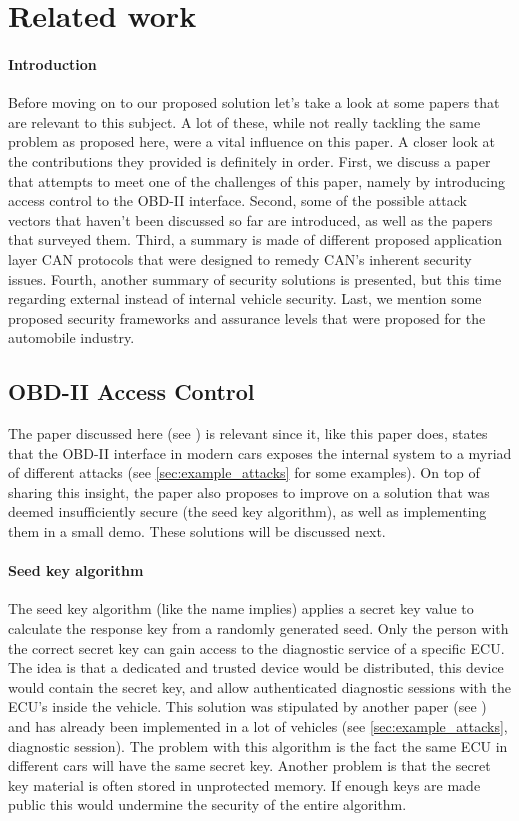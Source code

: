 \documentclass[master=cws,masteroption=vs,english]{kulemt}
\begin{document}
\section{Related work}
\label{sec:related_work}

\paragraph{Introduction} Before moving on to our proposed solution let's take a look at some papers that are relevant to this subject. A lot of these, while not really tackling the same problem as proposed here, were a vital influence on this paper. A closer look at the contributions they provided is definitely in order. First, we discuss a paper that attempts to meet one of the challenges of this paper, namely by introducing access control to the OBD-II interface. Second, some of the possible attack vectors that haven't been discussed so far are introduced, as well as the papers that surveyed them. Third, a summary is made of different proposed application layer CAN protocols that were designed to remedy CAN's inherent security issues. Fourth, another summary of security solutions is presented, but this time regarding external instead of internal vehicle security. Last, we mention some proposed security frameworks and assurance levels that were proposed for the automobile industry.

\subsection{OBD-II Access Control}
\label{sec:obd_access_control}

The paper discussed here (see \cite{Yadav16}) is relevant since it, like this paper does, states that the OBD-II interface in modern cars exposes the internal system to a myriad of different attacks (see \ref{sec:example_attacks} for some examples). On top of sharing this insight, the paper also proposes to improve on a solution that was deemed insufficiently secure (the seed key algorithm), as well as implementing them in a small demo. These solutions will be discussed next.


\paragraph{Seed key algorithm} The seed key algorithm (like the name implies) applies a secret key value to calculate the response key from a randomly generated seed. Only the person with the correct secret key can gain access to the diagnostic service of a specific ECU. The idea is that a dedicated and trusted device would be distributed, this device would contain the secret key, and allow authenticated diagnostic sessions with the ECU's inside the vehicle. This solution was stipulated by another paper (see \cite{Bayer}) and has already been implemented in a lot of vehicles (see \ref{sec:example_attacks}, diagnostic session). The problem with this algorithm is the fact the same ECU in different cars will have the same secret key. Another problem is that the secret key material is often stored in unprotected memory. If enough keys are made public this would undermine the security of the entire algorithm.  
\end{document}
